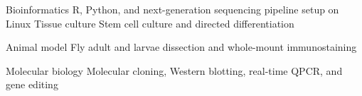 

\begin{cvskills}

  \cvskill
    {Bioinformatics} %
    {R, Python, and next-generation sequencing pipeline setup on Linux} %
  \cvskill
    {Tissue culture} %
    {Stem cell culture and directed differentiation} %
    

    \cvskill
        {Animal model}
        {Fly adult and larvae dissection and whole-mount immunostaining}

  \cvskill
    {Molecular biology} %
    {Molecular cloning, Western blotting, real-time QPCR, and gene editing} %

\end{cvskills}

